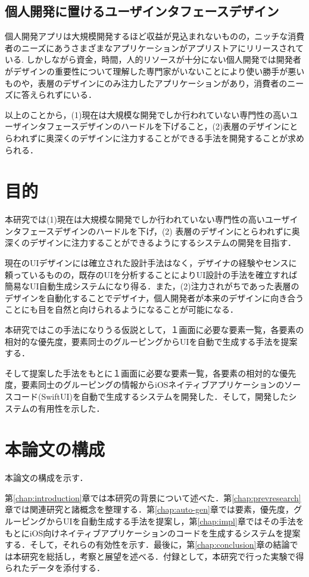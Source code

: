 \subsection{個人開発に置けるユーザインタフェースデザイン}
個人開発アプリは大規模開発するほど収益が見込まれないものの，ニッチな消費者のニーズにあうさまざまなアプリケーションがアプリストアにリリースされている.
しかしながら資金，時間，人的リソースが十分にない個人開発では開発者がデザインの重要性について理解した専門家がいないことにより使い勝手が悪いものや，表層のデザインにのみ注力したアプリケーションがあり，消費者のニーズに答えられずにいる．


以上のことから，(1)現在は大規模な開発でしか行われていない専門性の高いユーザインタフェースデザインのハードルを下げること，(2)表層のデザインにとらわれずに奥深くのデザインに注力することができる手法を開発することが求められる．

\section{目的}
本研究では(1)現在は大規模な開発でしか行われていない専門性の高いユーザインタフェースデザインのハードルを下げ，(2) 表層のデザインにとらわれずに奥深くのデザインに注力することができるようにするシステムの開発を目指す．

現在のUIデザインには確立された設計手法はなく，デザイナの経験やセンスに頼っているものの，既存のUIを分析することによりUI設計の手法を確立すれば簡易なUI自動生成システムになり得る．また，(2)注力されがちであった表層のデザインを自動化することでデザイナ，個人開発者が本来のデザインに向き合うことにも目を自然と向けられるようになることが可能になる．

本研究ではこの手法になりうる仮説として，１画面に必要な要素一覧，各要素の相対的な優先度，要素同士のグルーピングからUIを自動で生成する手法を提案する．


そして提案した手法をもとに１画面に必要な要素一覧，各要素の相対的な優先度，要素同士のグルーピングの情報からiOSネイティブアプリケーションのソースコード(SwiftUI)を自動で生成するシステムを開発した．そして，開発したシステムの有用性を示した．

\section{本論文の構成}

本論文の構成を示す．

第\ref{chap:introduction}章では本研究の背景について述べた．第\ref{chap:prevresearch}章では関連研究と諸概念を整理する．第\ref{chap:auto-gen}章では要素，優先度，グルーピングからUIを自動生成する手法を提案し，第\ref{chap:impl}章ではその手法をもとにiOS向けネイティブアプリケーションのコードを生成するシステムを提案する．そして，それらの有効性を示す．最後に，第\ref{chap:conclusion}章の結論では本研究を総括し，考察と展望を述べる．付録として，本研究で行った実験で得られたデータを添付する．
